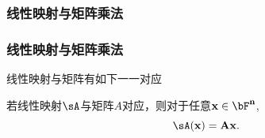 \subsubsection{线性映射与矩阵乘法}
\begin{frame}\frametitle{线性映射与矩阵乘法}
线性映射与矩阵有如下一一对应
\begin{center}
\end{center}
\pp
\bigskip
若线性映射$\sA$与矩阵$A$对应，则对于任意$\bf x \in \bF^n$,
\[\sA (\bf x) = A\bf x.\]

\end{frame}









